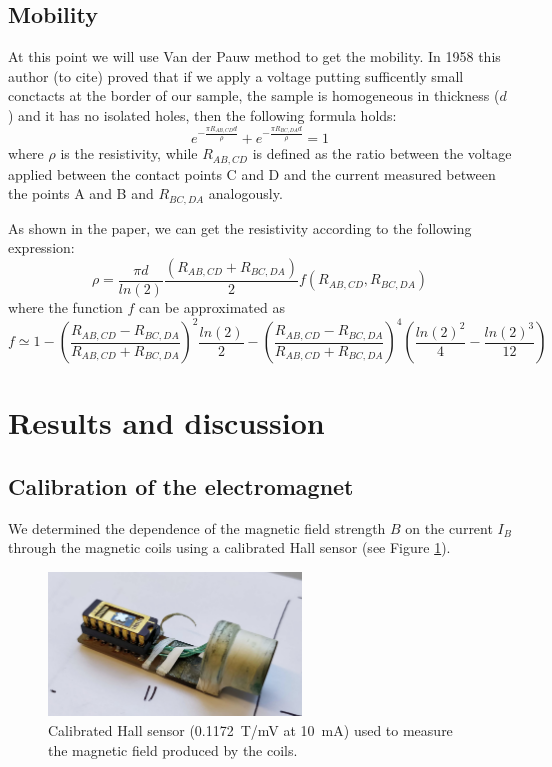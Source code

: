 \documentclass[11pt,a4paper]{article}
\begin{document}
\subsection{Mobility}
At this point we will use Van der Pauw method to get the mobility. In 1958 this author (to cite) proved that if we apply a voltage putting sufficently small conctacts at the border of our sample, the sample is homogeneous in thickness ($d$) and it has no isolated holes, then the following formula holds:
\begin{equation}
e^{-\frac{\pi R_{AB,CD}d}{\rho}}+e^{-\frac{\pi R_{BC,DA}d}{\rho}}=1
\end{equation}
where $\rho$ is the resistivity, while $R_{AB,CD}$ is defined as the ratio between the voltage applied between the contact points C and D and the current measured between the points A and B and $R_{BC,DA}$ analogously.

As shown in the paper, we can get the resistivity according to the following expression:
\begin{equation}
\rho=\frac{\pi d}{ln(2)}\frac{(R_{AB,CD}+R_{BC,DA})}{2}f\left(R_{AB,CD},R_{BC,DA}\right)
\end{equation}
where the function $f$ can be approximated as
\begin{equation}
f \simeq 1-\left(\frac{R_{AB,CD}-R_{BC,DA}}{R_{AB,CD}+R_{BC,DA}}\right)^2 \frac{ln(2)}{2}-\left(\frac{R_{AB,CD}-R_{BC,DA}}{R_{AB,CD}+R_{BC,DA}}\right)^4\left(\frac{ln(2)^2}{4}-\frac{ln(2)^3}{12}\right)
\end{equation}

\section{Results and discussion}

\subsection{Calibration of the electromagnet}

We determined the dependence of the magnetic field strength $B$ on the current $I_B$ through the magnetic coils using a calibrated Hall sensor (see Figure \ref{fig:Hall_sensor}).

\begin{figure}[ht]
\centering
\includegraphics[width=0.6\textwidth]{Hall_sensor}
\caption{Calibrated Hall sensor (\SI{0.1172}{\tesla/\milli\volt} at \SI{10}{\milli\ampere}) used to measure the magnetic field produced by the coils.}
\label{fig:Hall_sensor}
\end{figure}
\end{document}
